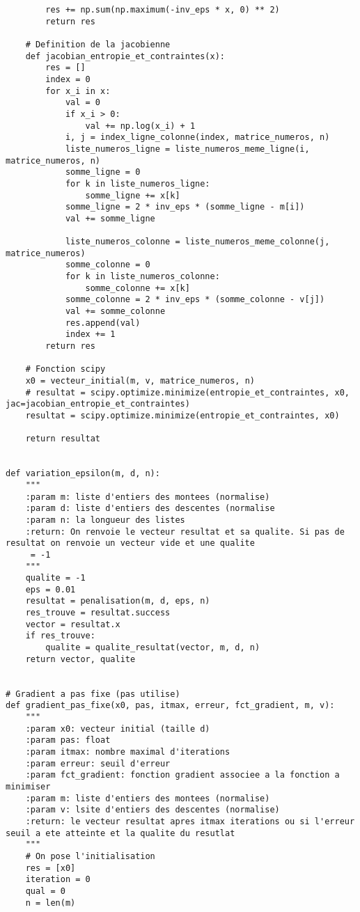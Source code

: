 \documentclass[12pt]{article}
\begin{document}
\begin{lstlisting}
        res += np.sum(np.maximum(-inv_eps * x, 0) ** 2)
        return res

    # Definition de la jacobienne
    def jacobian_entropie_et_contraintes(x):
        res = []
        index = 0
        for x_i in x:
            val = 0
            if x_i > 0:
                val += np.log(x_i) + 1
            i, j = index_ligne_colonne(index, matrice_numeros, n)
            liste_numeros_ligne = liste_numeros_meme_ligne(i, matrice_numeros, n)
            somme_ligne = 0
            for k in liste_numeros_ligne:
                somme_ligne += x[k]
            somme_ligne = 2 * inv_eps * (somme_ligne - m[i])
            val += somme_ligne

            liste_numeros_colonne = liste_numeros_meme_colonne(j, matrice_numeros)
            somme_colonne = 0
            for k in liste_numeros_colonne:
                somme_colonne += x[k]
            somme_colonne = 2 * inv_eps * (somme_colonne - v[j])
            val += somme_colonne
            res.append(val)
            index += 1
        return res

    # Fonction scipy
    x0 = vecteur_initial(m, v, matrice_numeros, n)
    # resultat = scipy.optimize.minimize(entropie_et_contraintes, x0, jac=jacobian_entropie_et_contraintes)
    resultat = scipy.optimize.minimize(entropie_et_contraintes, x0)

    return resultat


def variation_epsilon(m, d, n):
    """
    :param m: liste d'entiers des montees (normalise)
    :param d: liste d'entiers des descentes (normalise
    :param n: la longueur des listes
    :return: On renvoie le vecteur resultat et sa qualite. Si pas de resultat on renvoie un vecteur vide et une qualite
     = -1
    """
    qualite = -1
    eps = 0.01
    resultat = penalisation(m, d, eps, n)
    res_trouve = resultat.success
    vector = resultat.x
    if res_trouve:
        qualite = qualite_resultat(vector, m, d, n)
    return vector, qualite


# Gradient a pas fixe (pas utilise)
def gradient_pas_fixe(x0, pas, itmax, erreur, fct_gradient, m, v):
    """
    :param x0: vecteur initial (taille d)
    :param pas: float
    :param itmax: nombre maximal d'iterations
    :param erreur: seuil d'erreur
    :param fct_gradient: fonction gradient associee a la fonction a minimiser
    :param m: liste d'entiers des montees (normalise)
    :param v: lsite d'entiers des descentes (normalise)
    :return: le vecteur resultat apres itmax iterations ou si l'erreur seuil a ete atteinte et la qualite du resutlat
    """
    # On pose l'initialisation
    res = [x0]
    iteration = 0
    qual = 0
    n = len(m)


\end{lstlisting}
\end{document}
